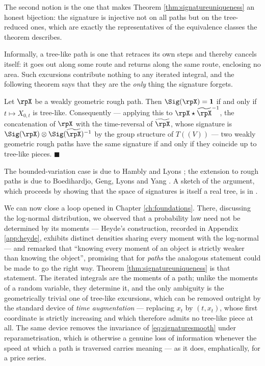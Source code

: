The second notion is the one that makes Theorem \ref{thm:signatureuniqueness} an honest
bijection: the signature is injective not on all paths but on the tree-reduced ones, which are
exactly the representatives of the equivalence classes the theorem describes.

Informally, a tree-like path is one that retraces its own steps and thereby cancels itself: it goes
out along some route and returns along the same route, enclosing no area. Such excursions contribute
nothing to any iterated integral, and the following theorem says that they are the \emph{only} thing
the signature forgets.

\begin{theorem}\label{thm:signatureuniqueness}
Let $\rpX$ be a weakly geometric rough path. Then $\Sig(\rpX) = \mathbf{1}$ if and only if
$t\mapsto X_{0,t}$ is tree-like. Consequently --- applying this to
$\rpX \star \widetilde\rpX^{-1}$, the concatenation of $\rpX$ with the time-reversal of
$\widetilde\rpX$, whose signature is $\Sig(\rpX)\otimes\Sig(\widetilde\rpX)^{-1}$ by the group
structure of $T((V))$ --- two weakly geometric rough paths have the same
signature if and only if they coincide up to tree-like pieces. \hfill $\blacksquare$
\end{theorem}

The bounded-variation case is due to Hambly and Lyons \cite{hamblylyons2010}; the extension to rough
paths is due to Boedihardjo, Geng, Lyons and Yang \cite{boedihardjo2016}. A sketch of the argument,
which proceeds by showing that the space of signatures is itself a real tree, is in
\cite[§4.3]{geng2021}.

\medskip

We can now close a loop opened in Chapter \ref{ch:foundations}. There, discussing the log-normal
distribution, we observed that a probability law need not be determined by its moments --- Heyde's
construction, recorded in Appendix \ref{app:heyde}, exhibits distinct densities sharing every
moment with the log-normal --- and remarked that ``knowing every moment of an object is strictly
weaker than knowing the object'', promising that for \emph{paths} the analogous statement could be
made to go the right way. Theorem \ref{thm:signatureuniqueness} is that statement. The iterated
integrals are the moments of a path; unlike the moments of a random variable, they determine it,
and the only ambiguity is the geometrically trivial one of tree-like excursions, which can be
removed outright by the standard device of \emph{time augmentation} --- replacing $x_t$ by
$(t, x_t)$, whose first coordinate is strictly increasing and which therefore admits no tree-like
piece at all. The same device removes the invariance of \eqref{eq:signaturesmooth} under
reparametrisation, which is otherwise a genuine loss of information whenever the speed at which a
path is traversed carries meaning --- as it does, emphatically, for a price series.


